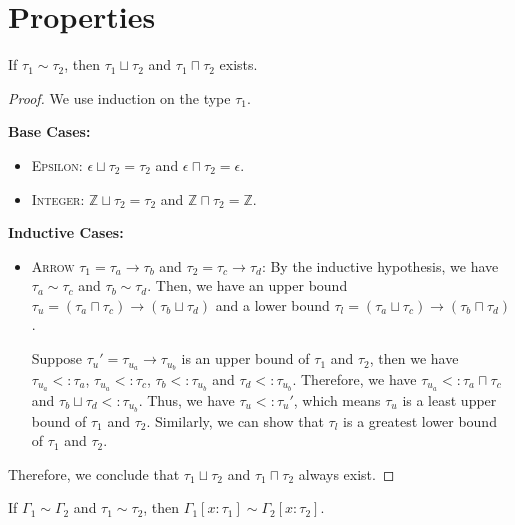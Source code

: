 \documentclass[peerreview, 10pt]{IEEEtran}
\newcommand{\Z}{\ensuremath{\mathbb{Z}}}
\newcommand{\arrowt}[2]{\ensuremath{{#1}\rightarrow{#2}}}
\begin{document}
\section*{Properties}

\begin{lemma}
    \label{lem:bound}
    If $\tau_1\sim\tau_2$, then $\tau_1\sqcup\tau_2$ and $\tau_1\sqcap\tau_2$ exists.
\end{lemma}

\begin{proof}
    We use induction on the type $\tau_1$.

    \textbf{Base Cases:}
    \begin{itemize}
        \item \textsc{Epsilon}: $\epsilon\sqcup\tau_2=\tau_2$ and $\epsilon\sqcap\tau_2=\epsilon$.
        \item \textsc{Integer}: $\Z\sqcup\tau_2=\tau_2$ and $\Z\sqcap\tau_2=\Z$.
    \end{itemize}

    \textbf{Inductive Cases:}
    \begin{itemize}
        \item \textsc{Arrow} $\tau_1=\arrowt{\tau_a}{\tau_b}$ and $\tau_2=\arrowt{\tau_c}{\tau_d}$: By the inductive hypothesis, we have $\tau_a\sim\tau_c$ and $\tau_b\sim\tau_d$. Then, we have an upper bound $\tau_u=\arrowt{(\tau_a\sqcap\tau_c)}{(\tau_b\sqcup\tau_d)}$ and a lower bound $\tau_l=\arrowt{(\tau_a\sqcup\tau_c)}{(\tau_b\sqcap\tau_d)}$.
        
        Suppose $\tau_u'=\arrowt{\tau_{u_a}}{\tau_{u_b}}$ is an upper bound of $\tau_1$ and $\tau_2$, then we have $\tau_{u_a} <: \tau_a$, $\tau_{u_a} <: \tau_c$, $\tau_b <: \tau_{u_b}$ and $\tau_d <: \tau_{u_b}$. Therefore, we have $\tau_{u_a} <: \tau_a\sqcap\tau_c$ and $\tau_b\sqcup\tau_d <: \tau_{u_b}$. Thus, we have $\tau_u <: \tau_u'$, which means $\tau_u$ is a least upper bound of $\tau_1$ and $\tau_2$. Similarly, we can show that $\tau_l$ is a greatest lower bound of $\tau_1$ and $\tau_2$.
    \end{itemize}

    Therefore, we conclude that $\tau_1\sqcup\tau_2$ and $\tau_1\sqcap\tau_2$ always exist.
\end{proof}

\begin{lemma}
    \label{lem:env-kind}
    If $\Gamma_1\sim\Gamma_2$ and $\tau_1\sim\tau_2$, then $\Gamma_1[x:\tau_1]\sim\Gamma_2[x:\tau_2]$.
\end{lemma}
\end{document}
